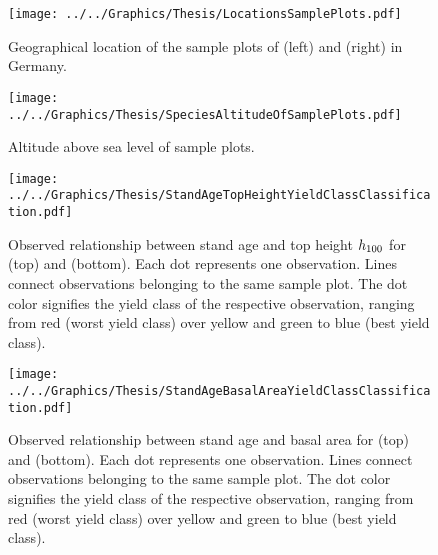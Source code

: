 \begin{figure}[H]
  \centering
  \texttt{[image: ../../Graphics/Thesis/LocationsSamplePlots.pdf]}
  \caption{Geographical location of the sample plots of \Beech{} (left) and \Spruce{} (right) in Germany.}
  \label{fig:LocationsSamplePlots}
\end{figure}

\begin{figure}[H]
  \centering
  \texttt{[image: ../../Graphics/Thesis/SpeciesAltitudeOfSamplePlots.pdf]}
  \caption{Altitude above sea level of sample plots.}
  \label{fig:SpeciesAltitudeOfSamplePlots}
\end{figure}

\newpage{}
\begin{figure}[H]
  \centering
  \texttt{[image: ../../Graphics/Thesis/StandAgeTopHeightYieldClassClassification.pdf]}
  \caption{Observed relationship between stand age and top height \(h_{100}\) for \Beech{} (top) and \Spruce{} (bottom).  Each dot represents one observation.  Lines connect observations belonging to the same sample plot.  The dot color signifies the yield class of the respective observation, ranging from red (worst yield class) over yellow and green to blue (best yield class).}
  \label{fig:StandAgeTopHeightYieldClassClassification}
\end{figure}

\newpage{}
\begin{figure}[H]
  \centering
  \texttt{[image: ../../Graphics/Thesis/StandAgeBasalAreaYieldClassClassification.pdf]}
  \caption{Observed relationship between stand age and basal area for \Beech{} (top) and \Spruce{} (bottom).  Each dot represents one observation.  Lines connect observations belonging to the same sample plot.  The dot color signifies the yield class of the respective observation, ranging from red (worst yield class) over yellow and green to blue (best yield class).}
  \label{fig:StandAgeBasalAreaYieldClassClassification}
\end{figure}


